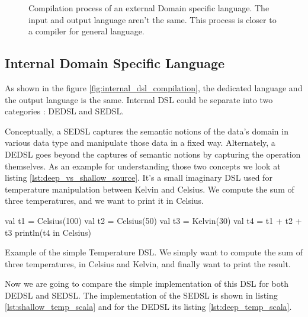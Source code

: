 \begin{figure}[ht]
  \centering
  \caption[Compilation process of an external \gls{DSL}]{Compilation process of
    an external Domain specific language. The input and output language aren't
    the same. This process is closer to a compiler for general language.}
  \label{fig:external_dsl_compilation}
\end{figure}

\subsection{Internal Domain Specific Language}
\label{sec:internal_dsl}

As shown in the figure \ref{fig:internal_dsl_compilation}, the dedicated language
and the output language is the same. Internal \gls{DSL} could be separate into
two categories : \gls{DEDSL} and \gls{SEDSL}.

Conceptually, a \gls{SEDSL} captures the semantic notions of the data’s domain in
various data type and manipulate those data in a fixed way. Alternately, a
\gls{DEDSL} goes beyond the captures of semantic notions by capturing the
operation themselves. As an example for understanding those two concepts we look
at listing \ref{lst:deep_vs_shallow_source}. It’s a small imaginary DSL used for
temperature manipulation between Kelvin and Celsius. We compute the sum
of three temperatures, and we want to print it in Celsius.

\begin{listing}[ht]
\centering
\begin{scalacode}
val t1 = Celsius(100)
val t2 = Celsius(50)
val t3 = Kelvin(30)
val t4 = t1 + t2 + t3
println(t4 in Celsius)
\end{scalacode}
\caption[Usage of the simple Temperature \gls{DSL}]{Example of the simple
Temperature \gls{DSL}. We simply want to compute the sum of three temperatures,
in Celsius and Kelvin, and finally want to print the result.}
\label{lst:deep_vs_shallow_source}
\end{listing}

Now we are going to compare the simple implementation of this \gls{DSL} for
both \gls{DEDSL} and \gls{SEDSL}. The implementation of the \gls{SEDSL} is
shown in listing \ref{lst:shallow_temp_scala} and for the \gls{DEDSL} its
listing \ref{lst:deep_temp_scala}.

